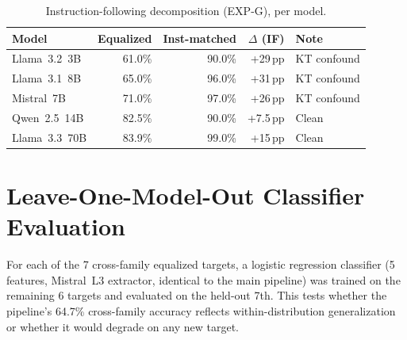 \begin{table}[h]
\centering
\caption{Instruction-following decomposition (EXP-G), per model.}
\label{tab:expg_summary}
\begin{tabular}{lrrrl}
\toprule
\textbf{Model} & \textbf{Equalized} & \textbf{Inst-matched} & \textbf{$\Delta$ (IF)} & \textbf{Note} \\
\midrule
Llama~3.2~3B  & 61.0\% & 90.0\% & +29\,pp & KT confound \\
Llama~3.1~8B  & 65.0\% & 96.0\% & +31\,pp & KT confound \\
Mistral~7B    & 71.0\% & 97.0\% & +26\,pp & KT confound \\
Qwen~2.5~14B  & 82.5\% & 90.0\% & +7.5\,pp & Clean \\
Llama~3.3~70B & 83.9\% & 99.0\% & +15\,pp & Clean \\
\bottomrule
\end{tabular}
\end{table}

\section{Leave-One-Model-Out Classifier Evaluation}\label{app:loo_across_models}

For each of the 7 cross-family equalized targets, a logistic regression classifier (5 features, Mistral~L3 extractor, identical to the main pipeline) was trained on the remaining 6 targets and evaluated on the held-out 7th. This tests whether the pipeline's 64.7\% cross-family accuracy reflects within-distribution generalization or whether it would degrade on any new target.

